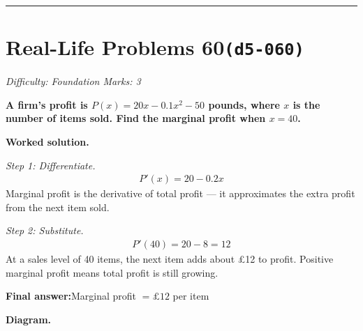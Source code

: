 \documentclass[11pt]{article}
\newcommand{\question}[1]{\par\medskip\noindent\textbf{#1}\par}
\begin{document}
\medskip\hrule

\section*{Real-Life Problems 60\quad\small\texttt{(d5-060)}}
\textit{Difficulty: Foundation \quad\textbar\quad Marks: 3}

\question{A firm's profit is \( P(x) = 20x - 0.1x^2 - 50 \) pounds, where \( x \) is the number of items sold. Find the marginal profit when \( x = 40 \).}

\textbf{Worked solution.}

\textit{Step 1: Differentiate.}
\[\begin{gathered}
P'(x) = 20 - 0.2x
\end{gathered}\]
Marginal profit is the derivative of total profit --- it approximates the extra profit from the next item sold.

\textit{Step 2: Substitute.}
\[\begin{gathered}
P'(40) = 20 - 8 = 12
\end{gathered}\]
At a sales level of 40 items, the next item adds about \pounds 12 to profit. Positive marginal profit means total profit is still growing.

\begin{answerbox}
\textbf{Final answer:}\quad Marginal profit \(\displaystyle  = \pounds 12 \) per item
\end{answerbox}
\textbf{Diagram.}
\end{document}
